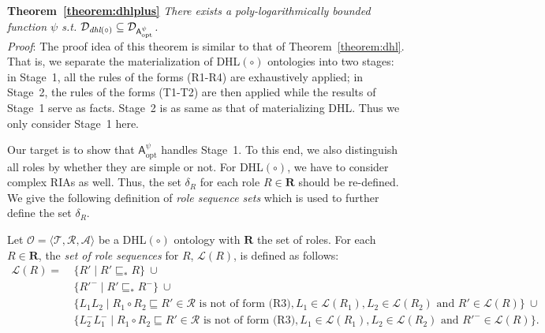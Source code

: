 \textbf{Theorem~\ref{theorem:dhlplus}}
\emph{There exists a poly-logarithmically bounded function $\psi$ s.t. $\mathcal{D}_{\textit{\text{dhl}}(\circ)}\subseteq\mathcal{D}_{\mathsf{A}_{\text{opt}}^{\psi}}$.}\\

\noindent\emph{Proof}: The proof idea of this theorem is similar to that of Theorem~\ref{theorem:dhl}.
That is, we separate the materialization of DHL$(\circ)$ ontologies into two stages: in Stage~1,
all the rules of the forms (R1-R4) are exhaustively applied; in Stage~2, the rules of the forms (T1-T2)
are then applied while the results of Stage~1 serve as facts. Stage~2 is as same as that of materializing
DHL. Thus we only consider Stage~1 here.

Our target is to show that $\mathsf{A}_{\text{opt}}^\psi$ handles Stage~1. To this end, we also
distinguish all roles by whether they are simple or not. For DHL$(\circ)$, we have to consider
complex RIAs as well. Thus,
the set $\delta_R$ for each role $R\in\textbf{R}$ should be re-defined.
We give the following definition of \emph{role sequence sets} which is
used to further define the set $\delta_R$.

\begin{definition}\label{def:language}
Let $\mathcal{O}=\langle\mathcal{T},\mathcal{R},\mathcal{A}\rangle$ be
a DHL$(\circ)$ ontology with $\textbf{R}$ the set of roles. For each
$R\in\textbf{R}$, the \emph{set of role sequences} for $R$,
$\mathcal{L}(R)$, is defined as follows:
\begin{align*}
\mathcal{L}(R) =\ & \{ R' \mid R'\sqsubseteq_* R \}\ \cup\\
& \{ R'^- \mid R' \sqsubseteq_* R^- \}\ \cup\\
& \{ L_1L_2 \mid R_1\circ R_2\sqsubseteq R'\in\mathcal{R} \text{ is
  not of form (R3)}, L_1\in\mathcal{L}(R_1), L_2\in\mathcal{L}(R_2) \text{ and }
  R'\in\mathcal{L}(R) \}\ \cup\\
& \{ L_2^-L_1^- \mid R_1\circ R_2\sqsubseteq R'\in\mathcal{R} \text{ is
  not of form (R3)}, L_1\in\mathcal{L}(R_1), L_2\in\mathcal{L}(R_2) \text{ and }
  R'^-\in\mathcal{L}(R) \}.
\end{align*}
\end{definition}

